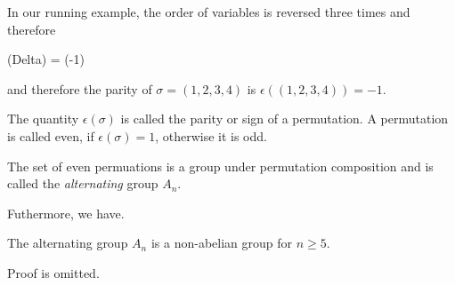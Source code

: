 In our running example, the order of variables is reversed three times and therefore

\bee
\sigma(Delta) = (-1) \Delta
\eee

and therefore the parity of $\sigma = (1,2,3,4)$ is $\epsilon((1,2,3,4)) = -1$.

\begin{definition}
The quantity $\epsilon(\sigma)$ is called the parity or sign of a permutation. A permutation is called even, if $\epsilon(\sigma) = 1$, otherwise it is odd.
\end{definition}

The set of even permuations is a group under permutation composition and is called the \emph{alternating} group $A_n$.

Futhermore, we have.

\begin{theorem}
The alternating group $A_n$ is a non-abelian group for $n \geq 5$.
\end{theorem}

Proof is omitted.


